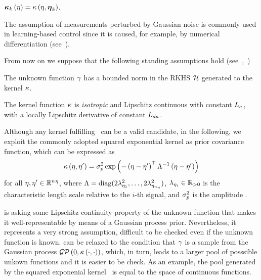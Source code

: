 $\boldsymbol{\kappa}_k \left( \eta \right) = \kappa \left( \eta, \boldsymbol{\eta}_k \right)$.
\begin{remark}
   The assumption of measurements perturbed by Gaussian noise is commonly used in learning-based control since it is caused, for example,
   by numerical differentiation (see~\cite{umlauft2017feedback}).
\end{remark}
From now on we suppose that the following standing assumptions hold (see~\cite{buisson2021joint},~\cite{lederer2021uniform})
\begin{assumption}%
   \label{ASSUM:PREP-GAMMA-CONTINUOUS-BOUNDED}
   The unknown function $\gamma$ has a bounded norm in the RKHS $\mathcal{H}$ generated to the kernel $\kappa$.
\end{assumption}
\begin{assumption}%
   \label{ASSUM:PREP-K-CONTINUOUS-BOUNDED}
   The kernel function $\kappa$ is \emph{isotropic} and Lipschitz continuous with constant $L_{\kappa}$, with a locally Lipschitz
   derivative of constant $L_{d\kappa}$. 
\end{assumption}
Although any kernel fulfilling~ can be a valid candidate, in the following,
we exploit the commonly adopted squared exponential kernel as prior covariance function, which can be expressed as
\begin{equation}%
   \label{EQ:PREP-EXPONENTIAL-KERNEL}
   \kf \lp \im, \im'\rp = \np \exp \lp -\lp \im - \im' \rp \T \Lambda^{-1}  \lp \im - \im'\rp \rp
\end{equation}
for all $\eta, \eta' \in \mathbb{R}^{n_{}{\eta}}$, where $\Lambda = \text{diag}(2\lambda_{\eta_1}^2, \dots, 2\lambda_{\eta_{n_{\eta}}}^2)$, $\lambda_{\eta_{i}} \in \mathbb{R}_{>0}$ is
the characteristic length scale relative to the $i$-th signal, and $\sigma_p^2$ is the amplitude \cite{rasmussen2003gaussian}.
\begin{remark}
    is asking some Lipschitz continuity property of the unknown function that makes it well-representable by means of a Gaussian process prior.
   Nevertheless, it represents a very strong assumption, difficult to be checked even if the unknown function is known.
    can be relaxed to the condition that $\gamma$ is a sample from the Gaussian process $\mathcal{GP} \left( 0, \kappa \left( \cdot, \cdot \right) \right)$,
   which, in turn, leads to a larger pool of posssible unkown functions and it is easier to be check. As an example, the pool generated by
   the squared exponenial kernel~ is equal to the space of continuous functions.
\end{remark}
